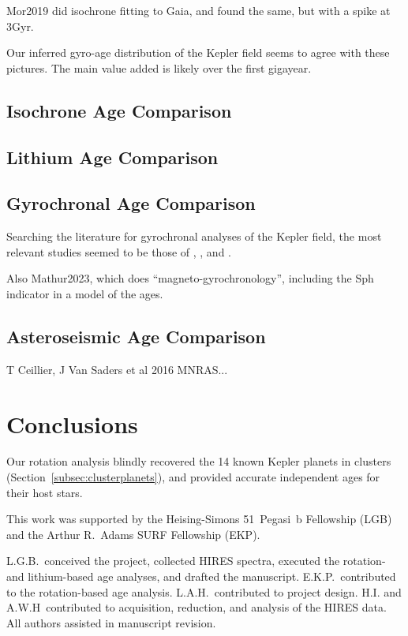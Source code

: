 \documentclass[11pt,twocolumn,tighten]{aastex63}
\begin{document}
Mor2019 did isochrone fitting to Gaia, and found the same, but with a
spike at 3Gyr.

Our inferred gyro-age distribution of the Kepler field seems to agree
with these pictures.  The main value added is likely over the first
gigayear.

\subsection{Isochrone Age Comparison}

\subsection{Lithium Age Comparison}

\subsection{Gyrochronal Age Comparison}
Searching the literature for gyrochronal analyses of the Kepler field,
the most relevant studies seemed to be those of
\citet{Walkowicz_2013}, \citet{Reinhold_2015}, and 
\citet{David_2021}.

Also Mathur2023, which does ``magneto-gyrochronology'', including the
Sph indicator in a model of the ages.


\subsection{Asteroseismic Age Comparison}
T Ceillier, J Van Saders et al 2016 MNRAS...


\section{Conclusions}
\label{sec:conclusions}

Our rotation analysis blindly recovered the 14 known Kepler planets in
clusters (Section~\ref{subsec:clusterplanets}), and provided accurate
independent ages for their host stars.




\acknowledgements
This work was supported by the 
Heising-Simons 51~Pegasi~b Fellowship (LGB)
and the Arthur R.~Adams SURF Fellowship (EKP).

L.G.B.~conceived the project, collected HIRES spectra, executed the
rotation- and lithium-based age analyses, and drafted the manuscript.
E.K.P.~contributed to the rotation-based age analysis.
L.A.H.~contributed to project design.
H.I. and A.W.H~contributed to acquisition, reduction, and analysis of
the HIRES data.
All authors assisted in manuscript revision.
\end{document}
